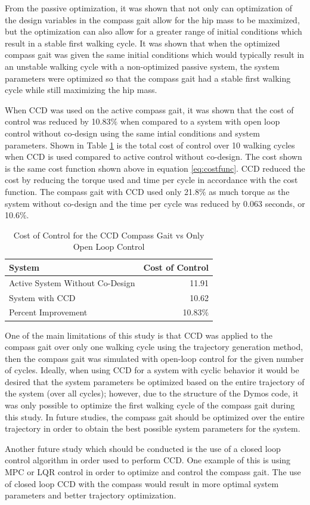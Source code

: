 \documentclass[smallextended]{./springer/svjour3}
\begin{document}
From the passive optimization, it was shown that not only can optimization 
of the design variables in the compass gait allow for the hip mass to be maximized, but the optimization can also allow for a greater range of initial conditions 
which result in a stable first walking cycle. It was shown that when the optimized compass gait was given the same initial conditions which would typically 
result in an unstable walking cycle with a non-optimized passive system, the system parameters were optimized so that the compass gait had a stable first walking cycle 
while still maximizing the hip mass.

When CCD was used on the active compass gait, it was shown that the cost of control was reduced by 10.83$\%$ when compared to a system 
with open loop control without co-design using the same intial conditions and system parameters. Shown in Table \ref{tab:costofcon} is the total cost of control over 10 
walking cycles when CCD is used compared to active control without co-design. The cost shown is the same cost function shown above in equation \ref{eq:costfunc}. CCD reduced the 
cost by reducing the torque used and time per cycle in accordance with the cost function. The compass gait with CCD used only 21.8$\%$ as much torque as the system without co-design 
and the time per cycle was reduced by 0.063 seconds, or 10.6$\%$.

\begin{table}[h]
\centering
\caption{Cost of Control for the CCD Compass Gait vs Only Open Loop Control}
\begin{tabular}{lr}
\toprule
System & Cost of Control \\
\midrule
Active System Without Co-Design & 11.91\\
System with CCD & 10.62\\
Percent Improvement & 10.83$\%$ \\
\end{tabular}
\label{tab:costofcon}
\end{table}

One of the main limitations of this study is that CCD was applied to the compass gait over only one walking cycle using the trajectory generation method,
then the compass gait was simulated with open-loop 
control for the given number of cycles.
Ideally, when using CCD for a system with cyclic behavior it would be desired that the system parameters be optimized based on the entire trajectory of the system 
(over all cycles); however, due to the structure of the Dymos code, it was only possible to optimize the first walking cycle of the compass gait during this study. 
In future studies, the compass gait should be optimized over the entire trajectory in order to obtain the best possible system parameters for the system.

Another future study which should be conducted is the use of a closed loop control algorithm in order used to perform CCD. One example of this is using 
MPC or LQR control in order to optimize and control the compass gait. The use of closed loop CCD with the compass would result in more optimal system parameters 
and better trajectory optimization. 
\end{document}
